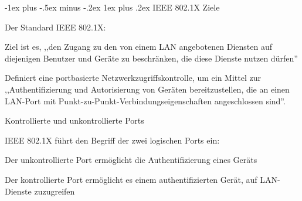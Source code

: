 \documentclass[a4paper]{article}
\makeatletter
\renewcommand{\subsubsection}{\@startsection{subsubsection}{3}{0mm}%
 {-1ex plus -.5ex minus -.2ex}%
 {1ex plus .2ex}%
 {\normalfont\small\bfseries}}
\makeatother
\begin{document}
\begin{multicols}{3}
      \subsubsection{IEEE 802.1X}
      Ziele
      \begin{itemize*}
            \item Der Standard IEEE 802.1X:
            \begin{itemize*}
                  \item Ziel ist es, ,,den Zugang zu den von einem LAN angebotenen Diensten auf diejenigen Benutzer und Geräte zu beschränken, die diese Dienste nutzen dürfen''
            \end{itemize*}
            \item Definiert eine portbasierte Netzwerkzugriffskontrolle, um ein Mittel
            zur ,,Authentifizierung und Autorisierung von Geräten bereitzustellen,
            die an einen LAN-Port mit Punkt-zu-Punkt-Verbindungseigenschaften
            angeschlossen sind''.
      \end{itemize*}

      Kontrollierte und unkontrollierte Ports
      \begin{itemize*}
            \item IEEE 802.1X führt den Begriff der zwei logischen Ports ein:
            \begin{itemize*}
                  \item Der unkontrollierte Port ermöglicht die Authentifizierung eines Geräts
                  \item Der kontrollierte Port ermöglicht es einem authentifizierten Gerät, auf LAN-Dienste zuzugreifen
            \end{itemize*}
      \end{itemize*}


\end{multicols}
\end{document}
